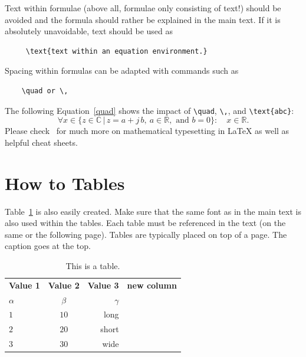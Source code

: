 Text within formulae (above all, formulae only consisting of text!) should be avoided and
the formula should rather be explained in the main text. If it is absolutely unavoidable,
text should be used as
\begin{verbatim}
     \text{text within an equation environment.}
\end{verbatim}
Spacing within formulas can be adapted with commands such as
\begin{verbatim}
    \quad or \,
\end{verbatim}
The following Equation~\eqref{quad} shows the impact of \verb|\quad|, \verb|\,|, and
\verb|\text{abc}|:
\begin{equation}
    \label{quad} \forall x \in \{ z\in\mathbb{C} \,|\, z = a + j\,b, \ a \in \mathbb{R},
    \text{ and } b = 0 \}: \quad x \in \mathbb{R}.
\end{equation}
Please check~\cite{TUG, Oet23} for much more on mathematical typesetting in \LaTeX{} as
well as helpful cheat sheets.

\section{How to Tables}
Table~\ref{tab:mytable} is also easily created. Make sure that the same font as in the
main text is also used within the tables. Each table must be referenced in the text (on
the same or the following page). Tables are typically placed on top of a page. The caption
goes at the top.
\begin{table}[t]
    \caption{This is a table.} %
    \label{tab:mytable} \centering \setlength{\tabcolsep}{4.5pt}
    \begin{tabular}{|l|c|r|c|} %
        \hline
        \textbf{Value 1} & \textbf{Value 2} & \textbf{Value 3} & \textbf{new column}\\
        $\alpha$ & $\beta$ & $\gamma$ & \\
        \hline 
        $1$ & $10$ & long & \\
        $2$ & $20$ & short & \\
        $3$ & $30$ & wide & \\
        \hline 
    \end{tabular}
\end{table}

